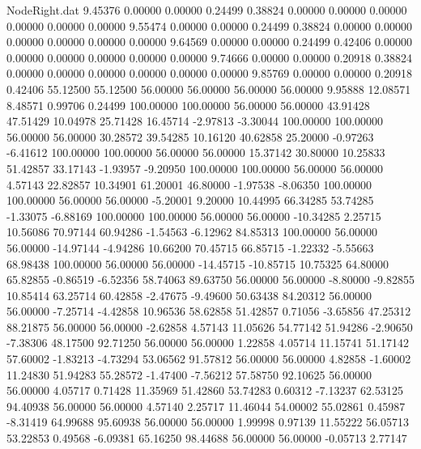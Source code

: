 \begin{filecontents}{NodeRight.dat}
   9.45376    0.00000    0.00000     0.24499    0.38824    0.00000    0.00000    0.00000    0.00000    0.00000    0.00000
   9.55474    0.00000    0.00000     0.24499    0.38824    0.00000    0.00000    0.00000    0.00000    0.00000    0.00000
   9.64569    0.00000    0.00000     0.24499    0.42406    0.00000    0.00000    0.00000    0.00000    0.00000    0.00000
   9.74666    0.00000    0.00000     0.20918    0.38824    0.00000    0.00000    0.00000    0.00000    0.00000    0.00000
   9.85769    0.00000    0.00000     0.20918    0.42406   55.12500   55.12500   56.00000   56.00000   56.00000   56.00000
   9.95888   12.08571    8.48571     0.99706    0.24499  100.00000  100.00000   56.00000   56.00000   43.91428   47.51429
  10.04978   25.71428   16.45714    -2.97813   -3.30044  100.00000  100.00000   56.00000   56.00000   30.28572   39.54285
  10.16120   40.62858   25.20000    -0.97263   -6.41612  100.00000  100.00000   56.00000   56.00000   15.37142   30.80000
  10.25833   51.42857   33.17143    -1.93957   -9.20950  100.00000  100.00000   56.00000   56.00000    4.57143   22.82857
  10.34901   61.20001   46.80000    -1.97538   -8.06350  100.00000  100.00000   56.00000   56.00000   -5.20001    9.20000
  10.44995   66.34285   53.74285    -1.33075   -6.88169  100.00000  100.00000   56.00000   56.00000  -10.34285    2.25715
  10.56086   70.97144   60.94286    -1.54563   -6.12962   84.85313  100.00000   56.00000   56.00000  -14.97144   -4.94286
  10.66200   70.45715   66.85715    -1.22332   -5.55663   68.98438  100.00000   56.00000   56.00000  -14.45715  -10.85715
  10.75325   64.80000   65.82855    -0.86519   -6.52356   58.74063   89.63750   56.00000   56.00000   -8.80000   -9.82855
  10.85414   63.25714   60.42858    -2.47675   -9.49600   50.63438   84.20312   56.00000   56.00000   -7.25714   -4.42858
  10.96536   58.62858   51.42857     0.71056   -3.65856   47.25312   88.21875   56.00000   56.00000   -2.62858    4.57143
  11.05626   54.77142   51.94286    -2.90650   -7.38306   48.17500   92.71250   56.00000   56.00000    1.22858    4.05714
  11.15741   51.17142   57.60002    -1.83213   -4.73294   53.06562   91.57812   56.00000   56.00000    4.82858   -1.60002
  11.24830   51.94283   55.28572    -1.47400   -7.56212   57.58750   92.10625   56.00000   56.00000    4.05717    0.71428
  11.35969   51.42860   53.74283     0.60312   -7.13237   62.53125   94.40938   56.00000   56.00000    4.57140    2.25717
  11.46044   54.00002   55.02861     0.45987   -8.31419   64.99688   95.60938   56.00000   56.00000    1.99998    0.97139
  11.55222   56.05713   53.22853     0.49568   -6.09381   65.16250   98.44688   56.00000   56.00000   -0.05713    2.77147

\end{filecontents}
